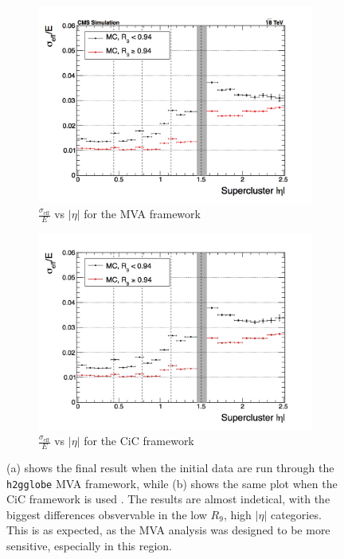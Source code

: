 \documentclass[10pt]{article}
\begin{document}
\begin{figure}[h!]
  \centering
  \begin{subfigure}{0.49\textwidth}
\includegraphics[width=\textwidth]{"EffSigma_vs_eta_mva"}
\caption{$\frac{\sigma_\text{eff}}{E}$ vs $|\eta|$ for the MVA framework}
\end{subfigure}
  \begin{subfigure}{0.49\textwidth}
  
\includegraphics[width=\textwidth]{"EffSigma_vs_eta_cic"}
\caption{$\frac{\sigma_\text{eff}}{E}$ vs $|\eta|$ for the CiC framework}
\end{subfigure}
\caption{(a) shows the final result when the initial data are run through the \texttt{h2gglobe} MVA framework, while (b) shows the same plot when the CiC framework is used . The results are almost indetical, with the biggest differences obsvervable in the low $R_9$, high $|\eta|$ categories. This is as expected, as the MVA analysis was designed to be more sensitive, especially in this region.}
\label{cicPlot}
\end{figure}
\end{document}
